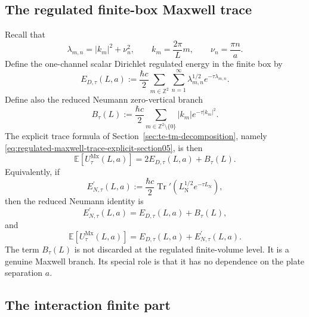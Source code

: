 \documentclass[11pt]{article}
\providecommand{\Z}{\mathbb{Z}}
\providecommand{\hbarc}{\hbar c}
\providecommand{\E}{\mathbb{E}}
\providecommand{\Tr}{\operatorname{Tr}}
\providecommand{\abs}[1]{\left\lvert #1\right\rvert}
\providecommand{\paren}[1]{\left(#1\right)}
\providecommand{\LN}{L_{\mathrm N}}
\providecommand{\lambdamn}{\lambda_{m,n}}
\providecommand{\UtauMx}{U_{\tau}^{\mathrm{Mx}}}
\providecommand{\EDtau}{E_{D,\tau}}
\providecommand{\ENtau}{E_{N,\tau}^{\prime}}
\providecommand{\Btau}{B_{\tau}}
\numberwithin{equation}{section}
\begin{document}
\subsection{The regulated finite-box Maxwell trace}
\label{subsec:regulated-finite-box-maxwell-trace-section06}

Recall that
\begin{equation}
\label{eq:lambda-mn-section06}
    \lambdamn=\abs{k_m}^2+\nu_n^2,
    \qquad
    k_m=\frac{2\pi}{L}m,
    \qquad
    \nu_n=\frac{\pi n}{a} .
\end{equation}
Define the one-channel scalar Dirichlet regulated energy in the finite box by
\begin{equation}
\label{eq:EDtau-def-section06}
    \EDtau(L,a)
    :=
    \frac{\hbarc}{2}
    \sum_{m\in\Z^2}\sum_{n=1}^{\infty}
    \lambdamn^{1/2}e^{-\tau\lambdamn} .
\end{equation}
Define also the reduced Neumann zero-vertical branch
\begin{equation}
\label{eq:Btau-def-section06}
    \Btau(L)
    :=
    \frac{\hbarc}{2}
    \sum_{m\in\Z^2\setminus\{0\}}
    \abs{k_m}e^{-\tau\abs{k_m}^2} .
\end{equation}
The explicit trace formula of Section~\ref{sec:te-tm-decomposition}, namely
\eqref{eq:regulated-maxwell-trace-explicit-section05}, is then
\begin{equation}
\label{eq:Maxwell-regulated-energy-2D-plus-B-section06}
    \E[\UtauMx(L,a)]
    =
    2\EDtau(L,a)+\Btau(L).
\end{equation}
Equivalently, if
\begin{equation}
\label{eq:ENtau-def-section06}
    \ENtau(L,a)
    :=
    \frac{\hbarc}{2}
    \Tr'\paren{\LN^{1/2}e^{-\tau\LN}},
\end{equation}
then the reduced Neumann identity is
\begin{equation}
\label{eq:ENtau-equals-EDtau-plus-Btau-section06}
    \ENtau(L,a)=\EDtau(L,a)+\Btau(L),
\end{equation}
and
\begin{equation}
\label{eq:Maxwell-regulated-energy-D-plus-N-section06}
    \E[\UtauMx(L,a)]
    =
    \EDtau(L,a)+\ENtau(L,a).
\end{equation}
The term \(\Btau(L)\) is not discarded at the regulated finite-volume level.
It is a genuine Maxwell branch.  Its special role is that it has no dependence
on the plate separation \(a\).

\subsection{The interaction finite part}
\label{subsec:interaction-finite-part-section06}
\end{document}
